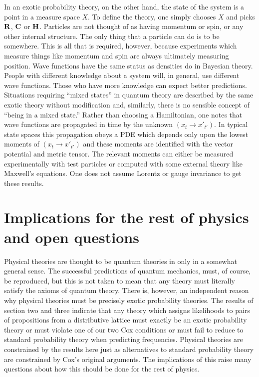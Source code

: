 \documentclass[12pt]{article}
\begin{document}
   In an exotic probability theory, on the other hand, 
the state of the system is a point in a measure space $X$.  To define the 
theory, one simply chooses $X$ and picks ${\bf R}$, ${\bf C}$ or ${\bf H}$.
Particles are not thought of as having momentum or spin, or any other 
internal structure.  The only thing that a particle can do is to be 
somewhere.  This is all that is required, however, because experiments which
measure things like momentum and spin are always ultimately measuring position.
Wave functions have the same status as densities do in Bayesian theory.
People with different knowledge about a system will, in general, use 
different wave functions.  Those who have more knowledge can expect better
predictions. Situations requiring ``mixed states'' in quantum theory are described
by the same exotic theory without modification\cite{mpl2} and, similarly, there is
no sensible concept of ``being in a mixed state.'' 
Rather than choosing a Hamiltonian, one notes that wave functions are
propagated in time by the unknown $(x_t\rightarrow x'_{t'})$.  In typical state 
spaces this propagation
obeys a PDE which depends only upon the lowest moments 
of $(x_t\rightarrow x'_{t'})$ and these moments are identified with the vector potential 
and metric tensor.  The relevant moments can either be measured experimentally with 
test particles or computed with some external theory like Maxwell's equations.
One does not assume Lorentz or gauge invariance to get these results.

\section{Implications for the rest of physics and open questions}

    Physical theories are thought to be quantum theories in only
in a somewhat general sense.  The successful predictions of quantum
mechanics, must, of course, be reproduced, but this is not taken to mean
that any theory must literally satisfy the axioms of quantum theory.  
There is, however, an independent reason why physical theories must
be precisely exotic probability theories.  The results of section two
and three indicate that any theory which assigns likelihoods
to pairs of propositions from a distributive lattice must exactly 
be an exotic probability theory or must violate one of our two Cox
conditions or must fail to reduce to standard probability theory 
when predicting frequencies.  Physical theories are constrained by 
the results here just as alternatives to standard probability theory
are constrained by Cox's original arguments.  The implications of this
raise many questions about how this should be done for the rest of 
physics.
\end{document}
